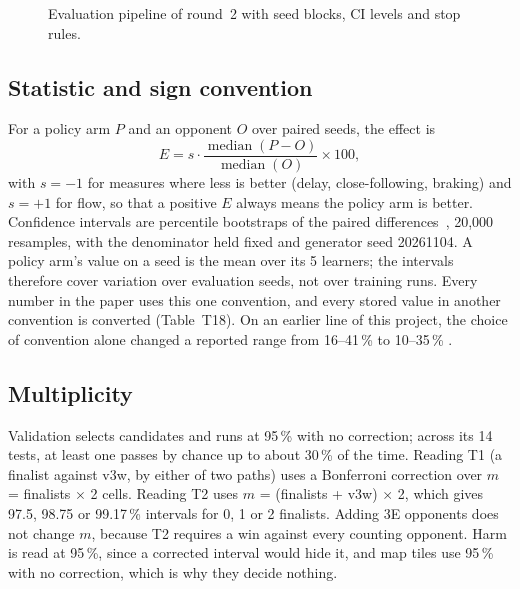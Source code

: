 \begin{figure}[tbp]
\centering
{}
\caption{Evaluation pipeline of round~2 with seed blocks, CI levels and stop rules.}\label{fig:pipeline}
\end{figure}

\subsection{Statistic and sign convention}\label{sec:statistic}

For a policy arm $P$ and an opponent $O$ over paired seeds, the effect is
\begin{equation}
E = s \cdot \frac{\operatorname{median}(P - O)}{\operatorname{median}(O)} \times 100,
\end{equation}
with $s = -1$ for measures where less is better (delay, close-following, braking) and $s = +1$ for flow, so that a positive $E$ always means the policy arm is better.
Confidence intervals are percentile bootstraps of the paired differences~\autocite{Efron1993}\verify, 20,000 resamples, with the denominator held fixed and generator seed 20261104.
A policy arm's value on a seed is the mean over its 5 learners; the intervals therefore cover variation over evaluation seeds, not over training runs.
Every number in the paper uses this one convention, and every stored value in another convention is converted (Table~T18).
On an earlier line of this project, the choice of convention alone changed a reported range from 16--41\,\% to 10--35\,\% .

\subsection{Multiplicity}\label{sec:multiplicity}

Validation selects candidates and runs at 95\,\% with no correction; across its 14 tests, at least one passes by chance up to about 30\,\% of the time.
Reading T1 (a finalist against v3w, by either of two paths) uses a Bonferroni correction over $m$ = finalists $\times$ 2 cells.
Reading T2 uses $m$ = (finalists + v3w) $\times$ 2, which gives 97.5, 98.75 or 99.17\,\% intervals for 0, 1 or 2 finalists.
Adding 3E opponents does not change $m$, because T2 requires a win against every counting opponent.
Harm is read at 95\,\%, since a corrected interval would hide it, and map tiles use 95\,\% with no correction, which is why they decide nothing.

